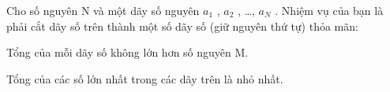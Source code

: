 Cho số nguyên N và một dãy số nguyên $a_{1}$   , $a_{2}$   , …, $a_{N}$   . Nhiệm vụ của bạn là phải cắt dãy số trên thành một số dãy số (giữ nguyên thứ tự) thỏa mãn:  

   Tổng của mỗi dãy số không lớn hơn số nguyên M.  

   Tổng của các số lớn nhất trong các dãy trên là nhỏ nhất.
